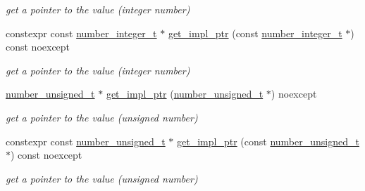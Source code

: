\begin{DoxyCompactItemize}
\begin{DoxyCompactList}\small\item\em get a pointer to the value (integer number) \end{DoxyCompactList}\item 
\mbox{\label{classnlohmann_1_1basic__json_a0a01103792cc54e9c8236361e5f7ed90}} 
constexpr const \mbox{\hyperlink{classnlohmann_1_1basic__json_a98e611d67b7bd75307de99c9358ab2dc}{number\+\_\+integer\+\_\+t}} $\ast$ \mbox{\hyperlink{classnlohmann_1_1basic__json_a0a01103792cc54e9c8236361e5f7ed90}{get\+\_\+impl\+\_\+ptr}} (const \mbox{\hyperlink{classnlohmann_1_1basic__json_a98e611d67b7bd75307de99c9358ab2dc}{number\+\_\+integer\+\_\+t}} $\ast$) const noexcept
\begin{DoxyCompactList}\small\item\em get a pointer to the value (integer number) \end{DoxyCompactList}\item 
\mbox{\label{classnlohmann_1_1basic__json_aa9aaed6b92909b263e04b5d25eba8d67}} 
\mbox{\hyperlink{classnlohmann_1_1basic__json_ab906e29b5d83ac162e823ada2156b989}{number\+\_\+unsigned\+\_\+t}} $\ast$ \mbox{\hyperlink{classnlohmann_1_1basic__json_aa9aaed6b92909b263e04b5d25eba8d67}{get\+\_\+impl\+\_\+ptr}} (\mbox{\hyperlink{classnlohmann_1_1basic__json_ab906e29b5d83ac162e823ada2156b989}{number\+\_\+unsigned\+\_\+t}} $\ast$) noexcept
\begin{DoxyCompactList}\small\item\em get a pointer to the value (unsigned number) \end{DoxyCompactList}\item 
\mbox{\label{classnlohmann_1_1basic__json_a52d0c7f354c6155221540baef5b98d0a}} 
constexpr const \mbox{\hyperlink{classnlohmann_1_1basic__json_ab906e29b5d83ac162e823ada2156b989}{number\+\_\+unsigned\+\_\+t}} $\ast$ \mbox{\hyperlink{classnlohmann_1_1basic__json_a52d0c7f354c6155221540baef5b98d0a}{get\+\_\+impl\+\_\+ptr}} (const \mbox{\hyperlink{classnlohmann_1_1basic__json_ab906e29b5d83ac162e823ada2156b989}{number\+\_\+unsigned\+\_\+t}} $\ast$) const noexcept
\begin{DoxyCompactList}\small\item\em get a pointer to the value (unsigned number) \end{DoxyCompactList}\item 

\end{DoxyCompactItemize}
